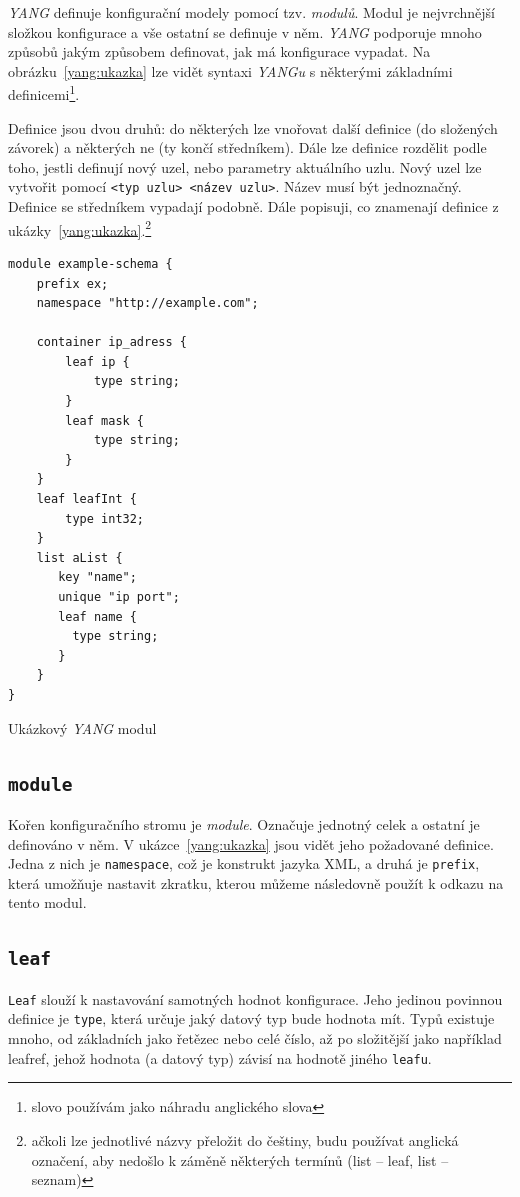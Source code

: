 \documentclass[thesis=B,czech,hidelinks]{FITthesis}[2019/03/06]
\begin{document}
\textit{YANG} definuje konfigurační modely pomocí tzv. \textit{modulů}. Modul je nejvrchnější složkou konfigurace a vše ostatní se definuje v něm. \textit{YANG} podporuje mnoho způsobů jakým způsobem definovat, jak má konfigurace vypadat. Na obrázku~\ref{yang:ukazka} lze vidět syntaxi \textit{YANGu} s některými základními definicemi\footnote{slovo  používám jako náhradu anglického slova }.

Definice jsou dvou druhů: do některých lze vnořovat další definice (do složených závorek) a některých ne (ty končí středníkem). Dále lze definice rozdělit podle toho, jestli definují nový uzel, nebo parametry aktuálního uzlu. Nový uzel lze vytvořit pomocí \texttt{<typ~uzlu>~<název~uzlu>}. Název musí být jednoznačný. Definice se středníkem vypadají podobně. Dále popisuji, co znamenají definice z ukázky~\ref{yang:ukazka}.\footnote{ačkoli lze jednotlivé názvy přeložit do češtiny, budu používat anglická označení, aby nedošlo k záměně některých termínů (list -- leaf, list -- seznam)}

\begin{listing}
\begin{verbatim}
module example-schema {
    prefix ex;
    namespace "http://example.com";

    container ip_adress {
        leaf ip {
            type string;
        }
        leaf mask {
            type string;
        }
    }
    leaf leafInt {
        type int32;
    }
    list aList {
       key "name";
       unique "ip port";
       leaf name {
         type string;
       }
    }
}
\end{verbatim}
\caption{Ukázkový \textit{YANG} modul}\label{yang:ukazka}
\end{listing}
\subsection{\texttt{module}}
Kořen konfiguračního stromu je \textit{module}. Označuje jednotný celek a ostatní je definováno v něm. V ukázce~\ref{yang:ukazka} jsou vidět jeho požadované definice. Jedna z nich je \texttt{namespace}, což je konstrukt jazyka XML, a druhá je \texttt{prefix}, která umožňuje nastavit zkratku, kterou můžeme následovně použít k odkazu na tento modul.

\subsection{\texttt{leaf}}
\texttt{Leaf} slouží k nastavování samotných hodnot konfigurace. Jeho jedinou povinnou definice je \texttt{type}, která určuje jaký datový typ bude hodnota mít. Typů existuje mnoho, od základních jako řetězec nebo celé číslo, až po složitější jako například leafref, jehož hodnota (a datový typ) závisí na hodnotě jiného \texttt{leafu}.
\end{document}
